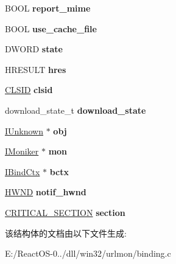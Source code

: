 \begin{DoxyCompactItemize}
B\+O\+OL {\bfseries report\+\_\+mime}
\item 
\mbox{\label{struct_binding_a528e17c96b80782f0e3c0478f6d6c5c6}} 
B\+O\+OL {\bfseries use\+\_\+cache\+\_\+file}
\item 
\mbox{\label{struct_binding_ae3cf29c316efee018c6d655e184cbdc0}} 
D\+W\+O\+RD {\bfseries state}
\item 
\mbox{\label{struct_binding_a4a008806c723f9c0fec9ecf914a34600}} 
H\+R\+E\+S\+U\+LT {\bfseries hres}
\item 
\mbox{\label{struct_binding_a5b9a763ca4217d2032649b1fa401f435}} 
\hyperlink{struct___i_i_d}{C\+L\+S\+ID} {\bfseries clsid}
\item 
\mbox{\label{struct_binding_ad21cb39db245dee4683c6dde3b31e0ac}} 
download\+\_\+state\+\_\+t {\bfseries download\+\_\+state}
\item 
\mbox{\label{struct_binding_a09174306219d75675cc67505afc73c82}} 
\hyperlink{interface_i_unknown}{I\+Unknown} $\ast$ {\bfseries obj}
\item 
\mbox{\label{struct_binding_aa2282a5ddd2aad666e4c910ba049ebcb}} 
\hyperlink{interface_i_moniker}{I\+Moniker} $\ast$ {\bfseries mon}
\item 
\mbox{\label{struct_binding_a42ae95c2d86650e7004122f4fd867963}} 
\hyperlink{interface_i_bind_ctx}{I\+Bind\+Ctx} $\ast$ {\bfseries bctx}
\item 
\mbox{\label{struct_binding_ae7ba5eb08d255c396b86b13ae865f4fe}} 
\hyperlink{interfacevoid}{H\+W\+ND} {\bfseries notif\+\_\+hwnd}
\item 
\mbox{\label{struct_binding_a306201e5febca9d98af8dcbdddfbc788}} 
\hyperlink{struct___c_r_i_t_i_c_a_l___s_e_c_t_i_o_n}{C\+R\+I\+T\+I\+C\+A\+L\+\_\+\+S\+E\+C\+T\+I\+ON} {\bfseries section}
\end{DoxyCompactItemize}


该结构体的文档由以下文件生成\+:\begin{DoxyCompactItemize}
\item 
E\+:/\+React\+O\+S-\/0../dll/win32/urlmon/binding.\+c\end{DoxyCompactItemize}
